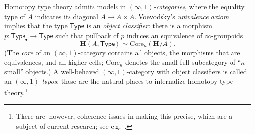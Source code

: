 \documentclass[copyright,12pt]{eptcs}
\makeatletter
\newcommand{\type}{\ensuremath{\mathsf{Type}}\xspace}
\renewcommand{\H}{\ensuremath{\mathbf{H}}\xspace}
\newcommand{\io}{\ensuremath{(\infty,1)}}
\def\jd#1{\@jd#1\ej}
\def\@jd#1|-#2\ej{\@@jd#1,,\;\vdash\;\left(#2\right)}
\def\@@jd#1,{\@ifmtarg{#1}{\let\next=\relax}{\left(#1\right)\let\next=\@@@jd}\next}
\def\@@@jd#1,{\@ifmtarg{#1}{\let\next=\relax}{,\,\left(#1\right)\let\next=\@@@jd}\next}
\makeatother
\begin{document}
Homotopy type theory admits models in \emph{\io-categories}, where the equality type of $A$ indicates its diagonal $A\to A\times A$.
%
%
Voevodsky's \emph{univalence axiom}~\cite{KLVunivalence} implies that the type \type is an
\emph{object classifier}: there is a morphism $p:{\type}_\bullet\to \type$ such that
pullback of $p$ induces an equivalence of $\infty$-groupoids
\begin{equation}
  \H(A,\type) \simeq \mathrm{Core}_\kappa(\H/A).\label{eq:objclassif}
\end{equation}
(The \emph{core} of an \io-category contains all objects, the morphisms that are equivalences, and all higher cells; $\mathrm{Core}_\kappa$ denotes the
small full subcategory of ``$\kappa$-small'' objects.)
%
%
A well-behaved \io-category with object classifiers is called an \emph{\io-topos}; these are the natural places to internalize homotopy type theory.\footnote{There are, however, coherence issues in making this precise, which are a subject of current research; see e.g.~\cite{ShulmanUnivalence,ShulmanUnivalence2}.}
\end{document}
